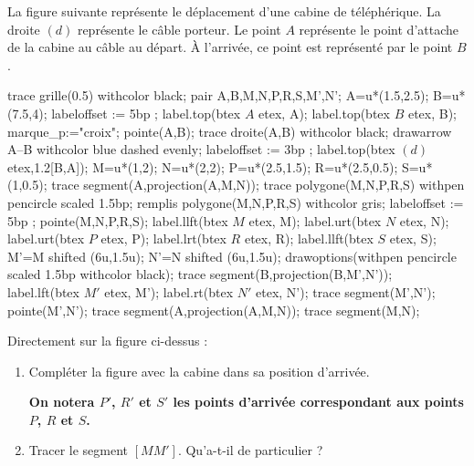 \begin{activite}[La cabine]    
    La figure suivante représente le déplacement d'une cabine de téléphérique. La droite $(d)$ représente le câble porteur.
    Le point $A$ représente le point d'attache de la cabine au câble au départ. À l'arrivée, ce point est représenté par le point $B$.

    \begin{center}
        \begin{Geometrie}[CoinHD={(11u,5u)}]
            trace grille(0.5) withcolor black;
            pair A,B,M,N,P,R,S,M',N';
            A=u*(1.5,2.5);
            B=u*(7.5,4);
            labeloffset := 5bp ;
            label.top(btex $A$ etex, A);
            label.top(btex $B$ etex, B);
            marque_p:="croix";
            pointe(A,B);
            trace droite(A,B) withcolor black;
            drawarrow A--B withcolor blue dashed evenly;
            labeloffset := 3bp ;
            label.top(btex $(d)$ etex,1.2[B,A]);
            M=u*(1,2);
            N=u*(2,2);
            P=u*(2.5,1.5);
            R=u*(2.5,0.5);
            S=u*(1,0.5);
            trace segment(A,projection(A,M,N));
            trace polygone(M,N,P,R,S) withpen pencircle scaled 1.5bp;
            remplis polygone(M,N,P,R,S) withcolor gris;
            labeloffset := 5bp ;
            pointe(M,N,P,R,S);
            label.llft(btex  $M$ etex, M);
            label.urt(btex  $N$ etex, N);
            label.urt(btex  $P$ etex, P);
            label.lrt(btex  $R$ etex, R);
            label.llft(btex $S$ etex, S);
            M'=M shifted (6u,1.5u);
            N'=N shifted (6u,1.5u);
            drawoptions(withpen pencircle scaled 1.5bp withcolor black);
            trace segment(B,projection(B,M',N'));
            label.lft(btex $M'$ etex, M');
            label.rt(btex $N'$ etex, N');
            trace segment(M',N');
            pointe(M',N');
            trace segment(A,projection(A,M,N));
            trace segment(M,N);
        \end{Geometrie}
    \end{center}
        Directement sur la figure ci-dessus :        
        \begin{enumerate}
        \item Compléter la figure avec la cabine dans sa position d'arrivée.
        
        \smallskip
        {\bfseries On notera $P'$, $R'$ et $S'$ les points d'arrivée correspondant aux points $P$, $R$ et $S$.}
        \smallskip
        \item Tracer le segment $[MM']$. Qu'a-t-il de particulier ?
        

\end{enumerate}
\end{activite}
